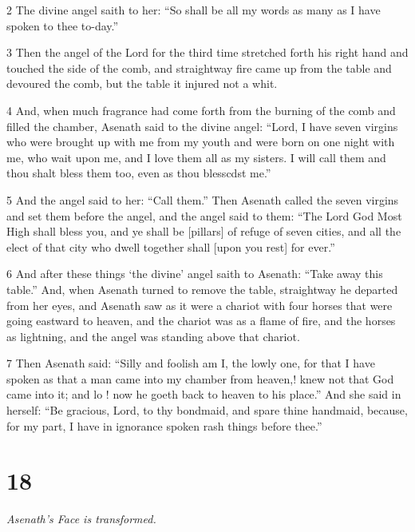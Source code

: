 \par 2 The divine angel saith to her: “So shall be all my words as many as I have spoken to thee to-day.” 

\par 3 Then the angel of the Lord for the third time stretched forth his right hand and touched the side of the comb, and straightway fire came up from the table and devoured the comb, but the table it injured not a whit. 

\par 4 And, when much fragrance had come forth from the burning of the comb and filled the chamber, Asenath said to the divine angel: “Lord, I have seven virgins who were brought up with me from my youth and were born on one night with me, who wait upon me, and I love them all as my sisters. I will call them and thou shalt bless them too, even as thou blesscdst me.” 

\par 5 And the angel said to her: “Call them.” Then Asenath called the seven virgins and set them before the angel, and the angel said to them: “The Lord God Most High shall bless you, and ye shall be [pillars] of refuge of seven cities, and all the elect of that city who dwell together shall [upon you rest] for ever.” 

\par 6 And after these things ‘the divine’ angel saith to Asenath: “Take away this table.” And, when Asenath turned to remove the table, straightway he departed from her eyes, and Asenath saw as it were a chariot with four horses that were going eastward to heaven, and the chariot was as a flame of fire, and the horses as lightning, and the angel was standing above that chariot. 

\par 7 Then Asenath said: “Silly and foolish am I, the lowly one, for that I have spoken as that a man came into my chamber from heaven,! knew not that God came into it; and lo ! now he goeth back to heaven to his place.” And she said in herself: “Be gracious, Lord, to thy bondmaid, and spare thine handmaid, because, for my part, I have in ignorance spoken rash things before thee.”

\chapter{18}

\par \textit{Asenath's Face is transformed.}

